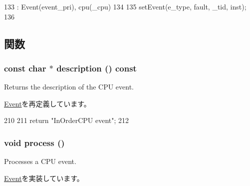 \begin{DoxyCode}
133     : Event(event_pri), cpu(_cpu)
134 {
135     setEvent(e_type, fault, _tid, inst);
136 }
\end{DoxyCode}


\subsection{関数}
\hypertarget{classInOrderCPU_1_1CPUEvent_a5a14fe478e2393ff51f02e9b7be27e00}{
\subsubsection[{description}]{\setlength{\rightskip}{0pt plus 5cm}const char $\ast$ description () const}}
\label{classInOrderCPU_1_1CPUEvent_a5a14fe478e2393ff51f02e9b7be27e00}
Returns the description of the CPU event. 

\hyperlink{classEvent_a130ddddf003422b413e2e891b1b80e8f}{Event}を再定義しています。


\begin{DoxyCode}
210 {
211     return "InOrderCPU event";
212 }
\end{DoxyCode}
\hypertarget{classInOrderCPU_1_1CPUEvent_a2e9c5136d19b1a95fc427e0852deab5c}{
\subsubsection[{process}]{\setlength{\rightskip}{0pt plus 5cm}void process ()}}
\label{classInOrderCPU_1_1CPUEvent_a2e9c5136d19b1a95fc427e0852deab5c}
Processes a CPU event. 

\hyperlink{classEvent_a142b75b68a6291400e20fb0dd905b1c8}{Event}を実装しています。


